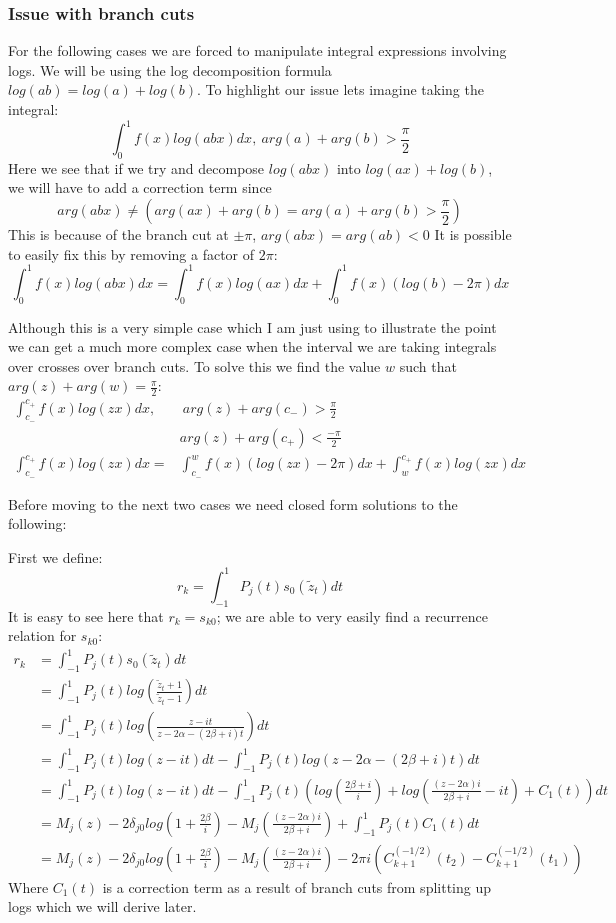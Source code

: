 \documentclass{article}
\begin{document}
\subsubsection*{Issue with branch cuts}
For the following cases we are forced to manipulate integral expressions involving logs.
We will be using the log decomposition formula $log(ab)=log(a)+log(b)$.
To highlight our issue lets imagine taking the integral:
$$\int_{0}^1 f(x)log(abx)dx,\:arg(a)+arg(b)>\frac{\pi}{2}$$
Here we see that if we try and decompose $log(abx)$ into $log(ax)+log(b)$,
we will have to add a correction term since
$$arg(abx)\neq (arg(ax)+arg(b)=arg(a)+arg(b)>\frac{\pi}{2})$$
This is because of the branch cut at $\pm\pi$, $arg(abx)=arg(ab)<0$
It is possible to easily fix this by removing a factor of $2\pi$:
$$\int_{0}^1 f(x)log(abx)dx = \int_{0}^1 f(x)log(ax)dx+\int_{0}^1 f(x)(log(b)-2\pi)dx$$

Although this is a very simple case which I am just using to illustrate the point we can get a much more complex case when the interval we are taking integrals over crosses over branch cuts.
To solve this we find the value $w$ such that $arg(z)+arg(w)=\frac{\pi}{2}$:
\begin{align}
    \int_{c_-}^{c_+}f(x)log(zx)dx,&\:arg(z)+arg(c_-)>\frac{\pi}{2}\\
    &arg(z)+arg(c_+)<\frac{-\pi}{2}\\
    \int_{c_-}^{c_+}f(x)log(zx)dx=&\int_{c_-}^wf(x)(log(zx)-2\pi)dx
    +\int_w^{c_+}f(x)log(zx)dx
\end{align}

Before moving to the next two cases we need closed form solutions to the following:

First we define: $$r_k = \int_{-1}^1P_j(t)s_0(\tilde{z}_t)dt$$
It is easy to see here that $r_k = s_{k0}$; we are able to very easily find a recurrence relation for $s_{k0}$:
\begin{align}
    r_k &= \int_{-1}^1P_j(t)s_0(\tilde{z}_t)dt\\
    &=\int_{-1}^1P_j(t)log(\frac{\tilde{z}_t+1}{\tilde{z}_t-1})dt\\
    &=\int_{-1}^1P_j(t)log(\frac{z-it}{z-2\alpha-(2\beta+i)t})dt\\
    &=\int_{-1}^1P_j(t)log(z-it)dt-\int_{-1}^1P_j(t)log(z-2\alpha-(2\beta+i)t)dt\\
    &=\int_{-1}^1P_j(t)log(z-it)dt
    -\int_{-1}^1P_j(t)(log(\frac{2\beta+i}{i})+log(\frac{(z-2\alpha)i}{2\beta+i}-it)+C_1(t))dt\\
    &=M_j(z)-2\delta_{j0}log(1+\frac{2\beta}{i})-M_j(\frac{(z-2\alpha)i}{2\beta+i})+\int_{-1}^1P_j(t)C_1(t)dt\\
    &=M_j(z)-2\delta_{j0}log(1+\frac{2\beta}{i})-M_j(\frac{(z-2\alpha)i}{2\beta+i})-2\pi i(C_{k+1}^{(-1/2)}(t_2)-C_{k+1}^{(-1/2)}(t_1))
\end{align}
Where $C_1(t)$ is a correction term as a result of branch cuts from splitting up logs which we will derive later.
\end{document}
